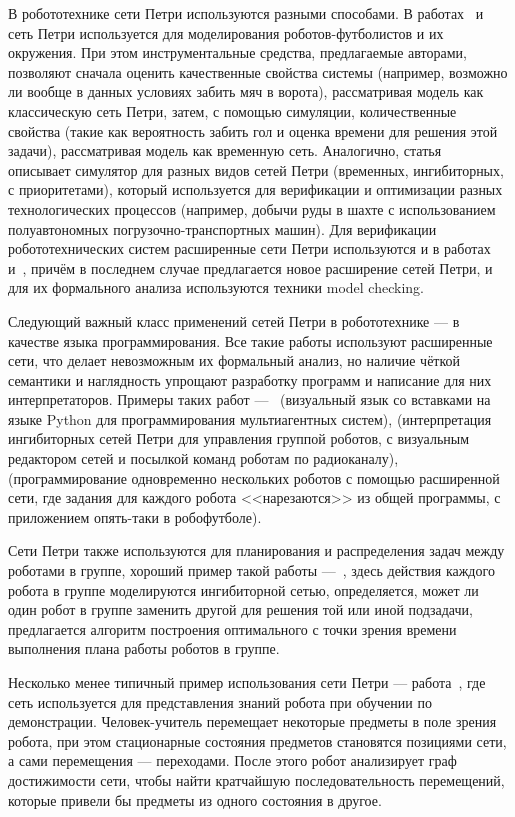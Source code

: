 \documentclass[conference]{IEEEtran}
\begin{document}
В робототехнике сети Петри используются разными способами. В работах~\cite{costelha2003petri}
и~\cite{costelha2010petri} сеть Петри используется для моделирования 
роботов-футболистов и их окружения. При этом инструментальные средства, предлагаемые 
авторами, позволяют сначала оценить качественные свойства системы (например, 
возможно ли вообще в данных условиях забить мяч в ворота), рассматривая модель 
как классическую сеть Петри, затем, с помощью симуляции, количественные свойства 
(такие как вероятность забить гол и оценка времени для решения этой задачи), 
рассматривая модель как временную сеть. Аналогично, статья~\cite{konukh2009imitation} 
описывает симулятор для разных видов сетей Петри (временных, ингибиторных, 
с приоритетами), который используется для верификации и оптимизации разных 
технологических процессов (например, добычи руды в шахте с использованием 
полуавтономных погрузочно-транспортных машин). Для верификации робототехнических 
систем расширенные сети Петри используются и в работах~\cite{aguiar2010petri} 
и~\cite{fu2014reconfigurable}, причём в последнем случае предлагается новое 
расширение сетей Петри, и для их формального анализа используются техники 
model checking.

Следующий важный класс применений сетей Петри в робототехнике --- в качестве 
языка программирования. Все такие работы используют расширенные сети, что делает 
невозможным их формальный анализ, но наличие чёткой семантики и наглядность 
упрощают разработку программ и написание для них интерпретаторов. Примеры таких 
работ ---~\cite{simon2010pytri} (визуальный язык со вставками на языке Python 
для программирования мультиагентных систем), \cite{kashima2001mobile} (интерпретация 
ингибиторных сетей Петри для управления группой роботов, с визуальным редактором 
сетей и посылкой команд роботам по радиоканалу), \cite{palamara2008soccer} 
(программирование одновременно нескольких роботов с помощью расширенной сети, 
где задания для каждого робота <<нарезаются>> из общей программы, с приложением 
опять-таки в робофутболе). 

Сети Петри также используются для планирования и распределения задач между 
роботами в группе, хороший пример такой работы ---~\cite{kotb2007multiagent}, 
здесь действия каждого робота в группе моделируются ингибиторной сетью, 
определяется, может ли один робот в группе заменить другой для решения той или 
иной подзадачи, предлагается алгоритм построения оптимального с точки зрения 
времени выполнения плана работы роботов в группе.

Несколько менее типичный пример использования сети Петри --- работа~\cite{chang2013learning},
где сеть используется для представления знаний робота при обучении по 
демонстрации. Человек-учитель перемещает некоторые предметы в поле зрения 
робота, при этом стационарные состояния предметов становятся позициями сети, 
а сами перемещения --- переходами. После этого робот анализирует граф 
достижимости сети, чтобы найти кратчайшую последовательность перемещений, которые 
привели бы предметы из одного состояния в другое.
\end{document}
